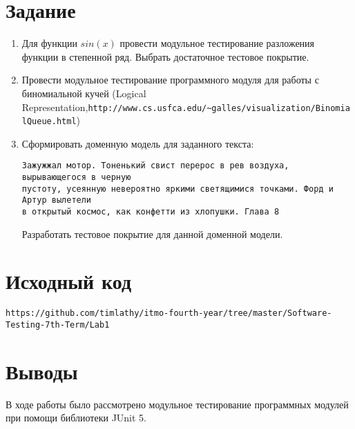 \documentclass[listings]{labreport}
\begin{document}
\maketitlepage

\section*{Задание}

\begin{enumerate}
  \item Для функции $sin(x)$ провести модульное тестирование разложения функции в степенной ряд. Выбрать достаточное тестовое покрытие.
  \item Провести модульное тестирование программного модуля для работы с биномиальной кучей
    (Logical Representation,\newline\verb|http://www.cs.usfca.edu/~galles/visualization/BinomialQueue.html|)
  \item Сформировать доменную модель для заданного текста:
\begin{verbatim}
Зажужжал мотор. Тоненький свист перерос в рев воздуха, вырывающегося в черную
пустоту, усеянную невероятно яркими светящимися точками. Форд и Артур вылетели
в открытый космос, как конфетти из хлопушки. Глава 8
\end{verbatim}
    Разработать тестовое покрытие для данной доменной модели.
\end{enumerate}

\section*{Исходный код}

\verb|https://github.com/timlathy/itmo-fourth-year/tree/master/Software-Testing-7th-Term/Lab1|

\section*{Выводы}

В ходе работы было рассмотрено модульное тестирование программных модулей
при помощи библиотеки JUnit 5.
\end{document}
